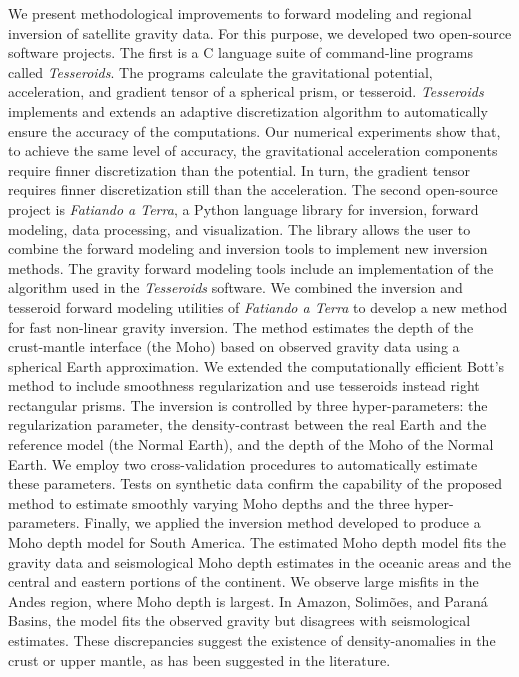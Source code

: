 \begin{foreignabstract}

We present methodological improvements to forward modeling and regional
inversion of satellite gravity data.
For this purpose, we developed two open-source software projects.
The first is a C language suite of command-line programs called
\textit{Tesseroids}.
The programs calculate the gravitational potential, acceleration, and gradient
tensor of a spherical prism, or tesseroid.
\textit{Tesseroids} implements and extends an adaptive discretization algorithm
to automatically ensure the accuracy of the computations.
Our numerical experiments show that, to achieve the same level of accuracy, the
gravitational acceleration components require finner discretization than the
potential.
In turn, the gradient tensor requires finner discretization still than the
acceleration.
The second open-source project is \textit{Fatiando a Terra}, a Python language
library for inversion, forward modeling, data processing, and visualization.
The library allows the user to combine the forward modeling and inversion tools
to implement new inversion methods.
The gravity forward modeling tools include an implementation of the
algorithm used in the \textit{Tesseroids} software.
We combined the inversion and tesseroid forward modeling utilities of
\textit{Fatiando a Terra} to develop a new method for fast non-linear gravity
inversion.
The method estimates the depth of the crust-mantle interface (the Moho) based
on observed gravity data using a spherical Earth approximation.
We extended the computationally efficient Bott's method to include smoothness
regularization and use tesseroids instead right rectangular prisms.
The inversion is controlled by three hyper-parameters: the regularization
parameter, the density-contrast between the real Earth and the reference model
(the Normal Earth), and the depth of the Moho of the Normal Earth.
We employ two cross-validation procedures to automatically estimate these
parameters.
Tests on synthetic data confirm the capability of the proposed method to
estimate smoothly varying Moho depths and the three hyper-parameters.
Finally, we applied the inversion method developed to produce a Moho depth
model for South America.
The estimated Moho depth model fits the gravity data and seismological Moho
depth estimates in the oceanic areas and the central and eastern portions of
the continent.
We observe large misfits in the Andes region, where Moho depth is largest.
In Amazon, Solimões, and Paraná Basins, the model fits the observed gravity
but disagrees with seismological estimates.
These discrepancies suggest the existence of density-anomalies in the crust or
upper mantle, as has been suggested in the literature.
\end{foreignabstract}
